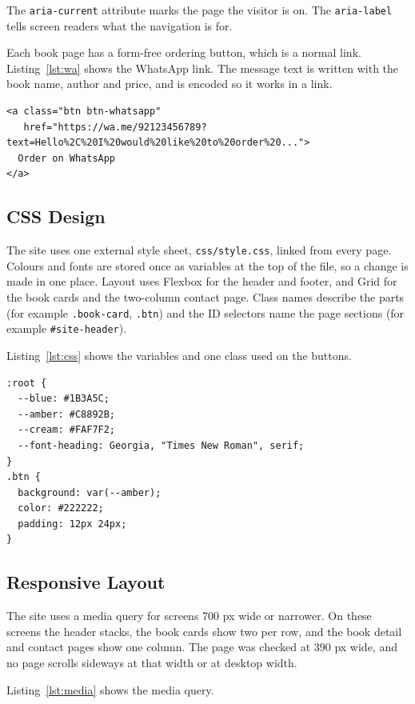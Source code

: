 \documentclass[12pt,a4paper]{article}
\begin{document}
The \texttt{aria-current} attribute marks the page the visitor is on. The \texttt{aria-label} tells screen readers what the navigation is for.

Each book page has a form-free ordering button, which is a normal link. Listing~\ref{lst:wa} shows the WhatsApp link. The message text is written with the book name, author and price, and is encoded so it works in a link.

\begin{lstlisting}[caption={WhatsApp order link on a book page},label={lst:wa}]
<a class="btn btn-whatsapp"
   href="https://wa.me/92123456789?text=Hello%2C%20I%20would%20like%20to%20order%20...">
  Order on WhatsApp
</a>
\end{lstlisting}

\subsection{CSS Design}
The site uses one external style sheet, \texttt{css/style.css}, linked from every page. Colours and fonts are stored once as variables at the top of the file, so a change is made in one place. Layout uses Flexbox for the header and footer, and Grid for the book cards and the two-column contact page. Class names describe the parts (for example \texttt{.book-card}, \texttt{.btn}) and the ID selectors name the page sections (for example \texttt{\#site-header}).

Listing~\ref{lst:css} shows the variables and one class used on the buttons.

\begin{lstlisting}[caption={Colour variables and button style},label={lst:css}]
:root {
  --blue: #1B3A5C;
  --amber: #C8892B;
  --cream: #FAF7F2;
  --font-heading: Georgia, "Times New Roman", serif;
}
.btn {
  background: var(--amber);
  color: #222222;
  padding: 12px 24px;
}
\end{lstlisting}

\subsection{Responsive Layout}
The site uses a media query for screens 700 px wide or narrower. On these screens the header stacks, the book cards show two per row, and the book detail and contact pages show one column. The page was checked at 390 px wide, and no page scrolls sideways at that width or at desktop width.

Listing~\ref{lst:media} shows the media query.
\end{document}
